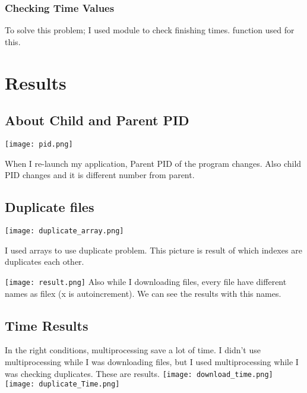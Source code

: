 \documentclass[]{article}
\begin{document}
\subsubsection{Checking Time Values}
To solve this problem; I used  module to check finishing times.  function used for this.


\section{Results}
\subsection{About Child and Parent PID}

\texttt{[image: pid.png]}

\newline\newline
When I re-launch my application, Parent PID of the program changes. Also child PID changes and it is different number from parent.

\subsection{Duplicate files}

\texttt{[image: duplicate\_array.png]}

\newline
I used arrays to use duplicate problem. This picture is result of which indexes are duplicates each other.\newline


\texttt{[image: result.png]}\newline
Also while I downloading files, every file have different names as filex (x is autoincrement). We can see the results with this names. 

\subsection{Time Results}
In the right conditions, multiprocessing save a lot of time. I didn't use multiprocessing while I was downloading files, but I used multiprocessing while I was checking duplicates. These are results. \newline\newline
\texttt{[image: download\_time.png]}\newline
\texttt{[image: duplicate\_Time.png]}
\end{document}
